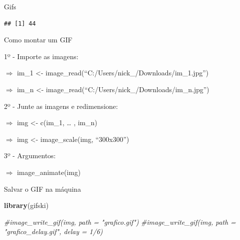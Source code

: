 \documentclass[
  ignorenonframetext,
]{beamer}
\newenvironment{Shaded}{\begin{snugshade}}{\end{snugshade}}
\newcommand{\CommentTok}[1]{\textcolor[rgb]{0.56,0.35,0.01}{\textit{#1}}}
\newcommand{\KeywordTok}[1]{\textcolor[rgb]{0.13,0.29,0.53}{\textbf{#1}}}
\newcommand{\NormalTok}[1]{#1}
\newcommand{\OperatorTok}[1]{\textcolor[rgb]{0.81,0.36,0.00}{\textbf{#1}}}
\newcommand{\StringTok}[1]{\textcolor[rgb]{0.31,0.60,0.02}{#1}}
\begin{document}
\begin{frame}[fragile]{Gifs}
\protect\hypertarget{gifs}{}

\begin{Shaded}
\end{Shaded}

\begin{verbatim}
## [1] 44
\end{verbatim}

\end{frame}

\begin{frame}{Como montar um GIF}
\protect\hypertarget{como-montar-um-gif}{}

1º - Importe as imagens:

\(\Rightarrow\) im\_1 \textless-
image\_read(``C:/Users/nick\_/Downloads/im\_1.jpg'')

\(\Rightarrow\) im\_n \textless-
image\_read(``C:/Users/nick\_/Downloads/im\_n.jpg'')

2º - Junte as imagens e redimensione:

\(\Rightarrow\) img \textless- c(im\_1, \ldots{} , im\_n)

\(\Rightarrow\) img \textless- image\_scale(img, ``300x300'')

3º - Argumentos:

\(\Rightarrow\) image\_animate(img)

\end{frame}

\begin{frame}[fragile]{Salvar o GIF na máquina}
\protect\hypertarget{salvar-o-gif-na-muxe1quina}{}

\begin{Shaded}
\begin{Highlighting}[]
\KeywordTok{library}\NormalTok{(gifski)}

\CommentTok{#image_write_gif(img, path = "grafico.gif")}
\CommentTok{#image_write_gif(img, path = "grafico_delay.gif", delay = 1/6)}
\end{Highlighting}
\end{Shaded}

\end{frame}
\end{document}
